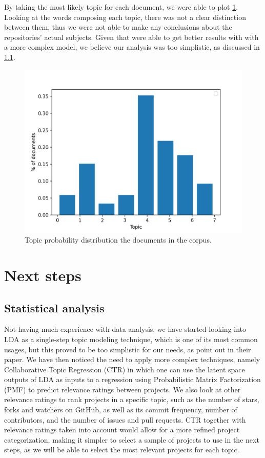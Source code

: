 \documentclass[11pt, conference, onecolumn, final]{IEEEtran}
\begin{document}
By taking the most likely topic for each document, we were able to plot
\cref{fig:topic-probabilities}.
Looking at the words composing each topic, there was not a clear distinction
between them, thus we were not able to make any conclusions about the
repositories' actual subjects.
Given that \cite{zheng2018measuring} were able to get better results with with
a more complex model, we believe our analysis was too simplistic, as discussed
in \cref{sec:next-steps-statistics}.

\begin{figure}[H]
    \centering
    \includegraphics[width=0.7\linewidth]{topic-probabilities.png}
    \caption{Topic probability distribution the documents in the corpus.}
    \label{fig:topic-probabilities}
\end{figure}

\section{Next steps} \label{sec:next-steps}

\subsection{Statistical analysis} \label{sec:next-steps-statistics}

Not having much experience with data analysis, we have started looking into LDA
as a single-step topic modeling technique, which is one of its most common
usages, but this proved to be too simplistic for our needs, as
\cite{zheng2018measuring} point out in their paper.
We have then noticed the need to apply more complex techniques, namely
Collaborative Topic Regression (CTR) in which one can use the latent space
outputs of LDA as inputs to a regression using Probabilistic Matrix
Factorization (PMF) to predict relevance ratings between projects.
We also look at other relevance ratings to rank projects in a specific topic,
such as the number of stars, forks and watchers on GitHub, as well as its
commit frequency, number of contributors, and the number of issues and pull
requests.
CTR together with relevance ratings taken into account would allow for a more
refined project categorization, making it simpler to select a sample of
projects to use in the next steps, as we will be able to select the most relevant
projects for each topic.
\end{document}

